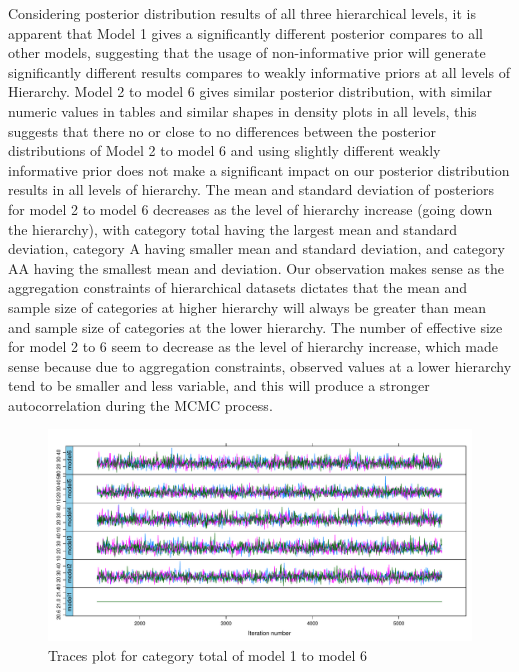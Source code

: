 Considering posterior distribution results of all three hierarchical levels, it is apparent that Model 1 gives a significantly different posterior compares to all other models, suggesting that the usage of non-informative prior will generate significantly different results compares to weakly informative priors at all levels of Hierarchy. Model 2 to model 6 gives similar posterior distribution, with similar numeric values in tables and similar shapes in density plots in all levels, this suggests that there no or close to no differences between the posterior distributions of Model 2 to model 6 and using slightly different weakly informative prior does not make a significant impact on our posterior distribution results in all levels of hierarchy. The mean and standard deviation of posteriors for model 2 to model 6 decreases as the level of hierarchy increase (going down the hierarchy), with category total having the largest mean and standard deviation, category A having smaller mean and standard deviation, and category AA having the smallest mean and deviation. Our observation makes sense as the aggregation constraints of hierarchical datasets dictates that the mean and sample size of categories at higher hierarchy will always be greater than mean and sample size of categories at the lower hierarchy. The number of effective size for model 2 to 6 seem to decrease as the level of hierarchy increase, which made sense because due to aggregation constraints, observed values at a lower hierarchy tend to be smaller and less variable, and this will produce a stronger autocorrelation during the MCMC process. 

\newpage 

\begin{figure}[!ht]
	\centering
	\includegraphics[width=1.0\linewidth]{../../R-codes/JAGS/plots/findmodel/Tracetotal3abn.PDF}
	\caption{Traces plot for category total of model 1 to model 6}
	\label{fig:tracetotal}
\end{figure}

